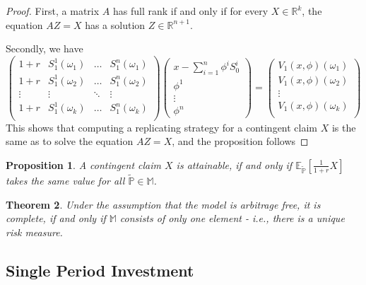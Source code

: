 \documentclass[10pt, oneside, reqno]{amsart}
\theoremstyle{plain}%
\newtheorem{thm}{Theorem}[subsection]
\newtheorem{prop}[thm]{Proposition}
\theoremstyle{definition}
\theoremstyle{remark}
\newcommand{\expp}[1]{\mathbb{E}_{\rnm}\left[#1\right]}
\newcommand{\R}{\mathbb{R}}
\newcommand{\sumni}{\sum_{i=1}^n}
\newcommand{\rnm}{\tilde{\mathbb{P}}}
\begin{document}
\begin{proof}
    First, a matrix $A$ has full rank if and only if for every $X \in \R^k$, the equation $AZ = X$ has a solution $Z \in \R^{n+1}$.  
    
    Secondly, we have \[
         \begin{pmatrix}
            1 +r & S^1_1 (\omega_1) & \ldots & S^n_1(\omega_1) \\
            1 +r & S^1_1 (\omega_2) & \ldots & S^n_1(\omega_2) \\
            \vdots & \vdots         & \ddots & \vdots  \\
            1 +r & S^1_1 (\omega_k) & \ldots & S^n_1(\omega_k) \\

        \end{pmatrix} 
        \begin{pmatrix}
            x - \sumni \phi^i S_0^i \\
            \phi^1 \\
            \vdots \\
            \phi^n
        \end{pmatrix}
        = 
        \begin{pmatrix}
            V_1(x,\phi)(\omega_1) \\
            V_1(x,\phi)(\omega_2) \\
            \vdots \\
            V_1(x,\phi)(\omega_k) \\
            
        \end{pmatrix}
    \]
    This shows that computing a replicating strategy for a contingent claim $X$ is the same as to solve the equation $AZ = X$, and the proposition follows
\end{proof}

\begin{prop}
    A contingent claim $X$ is attainable, if and only if $\expp{\frac{1}{1+r}X}$ takes the same value for all $\rnm \in \mathbb{M}$.
\end{prop}

\begin{thm}
    Under the assumption that the model is arbitrage free, it is complete, if and only if $\mathbb{M}$ consists of only one element - i.e., there is a unique risk measure.
\end{thm}

\subsection{Single Period Investment} %
\label{sec:single_period_investment}
\end{document}
